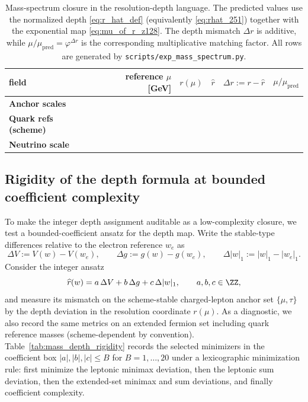 \begin{table}[t]
\centering
\small
\setlength{\tabcolsep}{6pt}
\renewcommand{\arraystretch}{1.15}
\begin{tabular}{lrrrrr}
\toprule
field & reference $\mu$ [GeV] & $r(\mu)$ & $\widehat r$ & $\Delta r:=r-\widehat r$ & $\mu/\mu_{\mathrm{pred}}$ \\
\midrule
\textbf{Anchor scales} & & & & & \\

\textbf{Quark refs (scheme)} & & & & & \\

\textbf{Neutrino scale} & & & & & \\

\end{tabular}
\caption{Mass-spectrum closure in the resolution-depth language. The predicted values use the normalized depth \eqref{eq:r_hat_def} (equivalently \eqref{eq:rhat_251}) together with the exponential map \eqref{eq:mu_of_r_z128}. The depth mismatch $\Delta r$ is additive, while $\mu/\mu_{\mathrm{pred}}=\varphi^{\Delta r}$ is the corresponding multiplicative matching factor. All rows are generated by \texttt{scripts/exp\_mass\_spectrum.py}.}
\label{tab:mass_spectrum}
\end{table}

\subsection{Rigidity of the depth formula at bounded coefficient complexity}
\label{subsec:mass_depth_rigidity}

To make the integer depth assignment auditable as a low-complexity closure, we test a bounded-coefficient ansatz for the depth map.
Write the stable-type differences relative to the electron reference $w_e$ as
\[
\Delta V:=V(w)-V(w_e),\qquad \Delta g:=g(w)-g(w_e),\qquad \Delta|w|_1:=|w|_1-|w_e|_1.
\]
Consider the integer ansatz
\begin{equation}\label{eq:rhat_abc_ansatz}
\widehat r(w)=a\,\Delta V+b\,\Delta g+c\,\Delta|w|_1,
\qquad a,b,c\in\ZZ,
\end{equation}
and measure its mismatch on the scheme-stable charged-lepton anchor set $\{\mu,\tau\}$ by the depth deviation in the resolution coordinate $r(\mu)$.
As a diagnostic, we also record the same metrics on an extended fermion set including quark reference masses (scheme-dependent by convention).
Table~\ref{tab:mass_depth_rigidity} records the selected minimizers in the coefficient box $|a|,|b|,|c|\le B$ for $B=1,\dots,20$ under a lexicographic minimization rule: first minimize the leptonic minimax deviation, then the leptonic sum deviation, then the extended-set minimax and sum deviations, and finally coefficient complexity.


